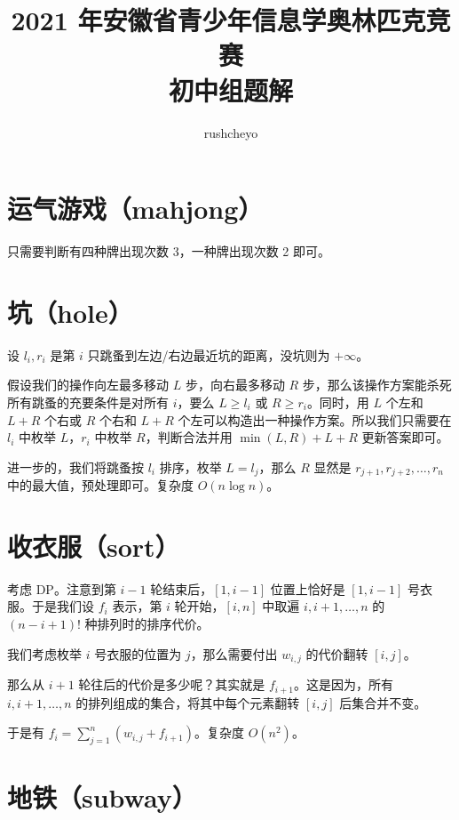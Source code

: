 \documentclass[12pt,a4paper,oneside]{article}
\begin{document}
\title{2021 年安徽省青少年信息学奥林匹克竞赛\\初中组题解}
\author{rushcheyo}
\maketitle

\section{运气游戏（mahjong）}

只需要判断有四种牌出现次数 3，一种牌出现次数 2 即可。

\section{坑（hole）}

设 $l_i,r_i$ 是第 $i$ 只跳蚤到左边/右边最近坑的距离，没坑则为 $+\infty$。

假设我们的操作向左最多移动 $L$ 步，向右最多移动 $R$ 步，那么该操作方案能杀死所有跳蚤的充要条件是对所有 $i$，要么 $L \ge l_i$ 或 $R \ge r_i$。同时，用 $L$ 个左和 $L+R$ 个右或 $R$ 个右和 $L+R$ 个左可以构造出一种操作方案。所以我们只需要在 $l_i$ 中枚举 $L$，$r_i$ 中枚举 $R$，判断合法并用 $\min(L,R)+L+R$ 更新答案即可。

进一步的，我们将跳蚤按 $l_i$ 排序，枚举 $L=l_j$，那么 $R$ 显然是 $r_{j+1},r_{j+2},\ldots,r_n$ 中的最大值，预处理即可。复杂度 $O(n \log n)$。

\section{收衣服（sort）}

考虑 DP。注意到第 $i-1$ 轮结束后，$[1,i-1]$ 位置上恰好是 $[1,i-1]$ 号衣服。于是我们设 $f_i$ 表示，第 $i$ 轮开始，$[i,n]$ 中取遍 $i,i+1,\ldots,n$ 的 $(n-i+1)!$ 种排列时的排序代价。

我们考虑枚举 $i$ 号衣服的位置为 $j$，那么需要付出 $w_{i,j}$ 的代价翻转 $[i,j]$。

那么从 $i+1$ 轮往后的代价是多少呢？其实就是 $f_{i+1}$。这是因为，所有 $i,i+1,\ldots,n$ 的排列组成的集合，将其中每个元素翻转 $[i,j]$ 后集合并不变。

于是有 $f_i=\sum_{j=1}^n (w_{i,j}+f_{i+1})$。复杂度 $O(n^2)$。

\section{地铁（subway）}
\end{document}
